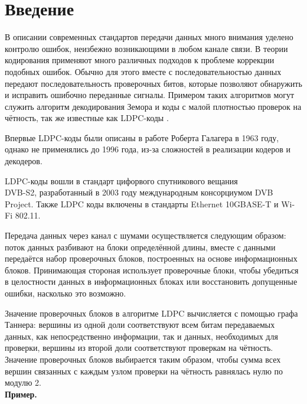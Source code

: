 \documentclass[14pt]{mmcs-article}
\begin{document}


\renewcommand{\contentsname}{Оглавление}

\tableofcontents

\newpage

\section*{Введение}

В описании современных стандартов передачи данных много внимания уделено контролю ошибок, неизбежно возникающими в любом канале связи. В теории кодирования применяют много различных подходов к проблеме коррекции подобных ошибок. Обычно для этого вместе с последовательностью данных передают последовательность проверочных битов, которые позволяют обнаружить и исправить ошибочно переданные сигналы. Примером таких алгоритмов могут служить алгоритм декодирования Земора \cite{zemor} и коды с малой плотностью проверок на чётность, так же известные как LDPC-коды \cite{johnson}.

Впервые LDPC-коды были описаны в работе Роберта Галагера \cite{gallager} в 1963 году, однако не применялись до 1996 года, из-за сложностей в реализации кодеров и декодеров.

LDPC-коды вошли в стандарт цифорвого спутникового вещания\\ DVB-S2, разработанный в 2003 году международным консорциумом DVB Project. Также LDPC коды включены в стандарты Ethernet 10GBASE-T и Wi-Fi 802.11.

Передача данных через канал с шумами осуществляется следующим образом: поток данных разбивают на блоки определённой длины, вместе с данными передаётся набор проверочных блоков, построенных на основе информационных блоков. Принимающая стороная использует проверочные блоки, чтобы убедиться в целостности данных в информационных блоках или восстановить допущенные ошибки, насколько это возможно.

Значение проверочных блоков в алгоритме LDPC вычисляется с помощью графа Таннера: вершины из одной доли соответствуют всем битам передаваемых данных, как непосредственно информации, так и данных, необходимых для проверки, вершины из второй доли соответствуют проверкам на чётность. Значение проверочных блоков выбирается таким образом, чтобы сумма всех вершин связанных с каждым узлом проверки на чётность равнялась нулю по модулю 2.
\\

\textbf{Пример.}
\end{document}
